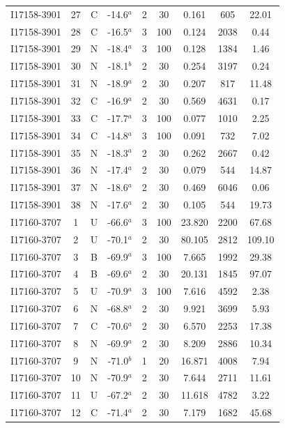 \begin{table}
\begin{tabular}{ccccccccc}
I17158-3901 & 27 & C & -14.6$^{a}$ & 2 & 30 & 0.161 & 605 & 22.01 \\
I17158-3901 & 28 & C & -16.5$^{a}$ & 3 & 100 & 0.124 & 2038 & 0.44 \\
I17158-3901 & 29 & N & -18.4$^{a}$ & 3 & 100 & 0.128 & 1384 & 1.46 \\
I17158-3901 & 30 & N & -18.1$^{b}$ & 2 & 30 & 0.254 & 3197 & 0.24 \\
I17158-3901 & 31 & N & -18.9$^{a}$ & 2 & 30 & 0.207 & 817 & 11.48 \\
I17158-3901 & 32 & C & -16.9$^{a}$ & 2 & 30 & 0.569 & 4631 & 0.17 \\
I17158-3901 & 33 & C & -17.7$^{a}$ & 3 & 100 & 0.077 & 1010 & 2.25 \\
I17158-3901 & 34 & C & -14.8$^{a}$ & 3 & 100 & 0.091 & 732 & 7.02 \\
I17158-3901 & 35 & N & -18.3$^{a}$ & 2 & 30 & 0.262 & 2667 & 0.42 \\
I17158-3901 & 36 & N & -17.4$^{a}$ & 2 & 30 & 0.079 & 544 & 14.87 \\
I17158-3901 & 37 & N & -18.6$^{a}$ & 2 & 30 & 0.469 & 6046 & 0.06 \\
I17158-3901 & 38 & N & -17.6$^{a}$ & 2 & 30 & 0.105 & 544 & 19.73 \\
I17160-3707 & 1 & U & -66.6$^{a}$ & 3 & 100 & 23.820 & 2200 & 67.68 \\
I17160-3707 & 2 & U & -70.1$^{a}$ & 2 & 30 & 80.105 & 2812 & 109.10 \\
I17160-3707 & 3 & B & -69.9$^{a}$ & 3 & 100 & 7.665 & 1992 & 29.38 \\
I17160-3707 & 4 & B & -69.6$^{a}$ & 2 & 30 & 20.131 & 1845 & 97.07 \\
I17160-3707 & 5 & U & -70.9$^{a}$ & 3 & 100 & 7.616 & 4592 & 2.38 \\
I17160-3707 & 6 & N & -68.8$^{a}$ & 2 & 30 & 9.921 & 3699 & 5.93 \\
I17160-3707 & 7 & C & -70.6$^{a}$ & 2 & 30 & 6.570 & 2253 & 17.38 \\
I17160-3707 & 8 & N & -69.9$^{a}$ & 2 & 30 & 8.209 & 2886 & 10.34 \\
I17160-3707 & 9 & N & -71.0$^{b}$ & 1 & 20 & 16.871 & 4008 & 7.94 \\
I17160-3707 & 10 & N & -70.9$^{a}$ & 2 & 30 & 7.644 & 2711 & 11.61 \\
I17160-3707 & 11 & U & -67.2$^{a}$ & 2 & 30 & 11.618 & 4782 & 3.22 \\
I17160-3707 & 12 & C & -71.4$^{a}$ & 2 & 30 & 7.179 & 1682 & 45.68 \\

\end{tabular}
\end{table}

